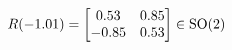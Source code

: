 \documentclass[preview]{standalone}
\begin{document}
\begin{align*}
\special{dvisvgm:raw <g id='unique000'>}R(-1.01) = \begin{bmatrix} 0.53 & 0.85 \\ -0.85 & 0.53 \end{bmatrix} \in \text{SO}(2)\special{dvisvgm:raw </g>}
\end{align*}
\end{document}
